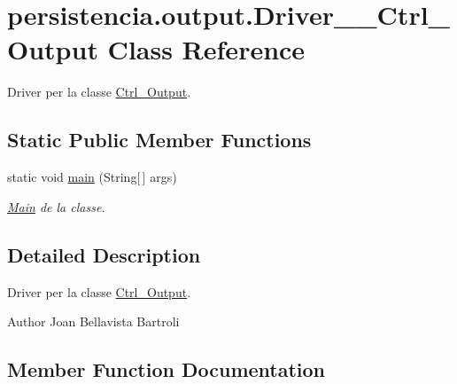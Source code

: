 \hypertarget{classpersistencia_1_1output_1_1Driver____Ctrl__Output}{}\section{persistencia.\+output.\+Driver\+\_\+\+\_\+\+Ctrl\+\_\+\+Output Class Reference}
\label{classpersistencia_1_1output_1_1Driver____Ctrl__Output}


Driver per la classe \hyperlink{classpersistencia_1_1output_1_1Ctrl__Output}{Ctrl\+\_\+\+Output}.  


\subsection*{Static Public Member Functions}
\begin{DoxyCompactItemize}
\item 
static void \hyperlink{classpersistencia_1_1output_1_1Driver____Ctrl__Output_ab5a20df1417ca8ac83a4c754c284599c}{main} (String\mbox{[}$\,$\mbox{]} args)
\begin{DoxyCompactList}\small\item\em \hyperlink{classMain}{Main} de la classe. \end{DoxyCompactList}\end{DoxyCompactItemize}


\subsection{Detailed Description}
Driver per la classe \hyperlink{classpersistencia_1_1output_1_1Ctrl__Output}{Ctrl\+\_\+\+Output}. 

\begin{DoxyAuthor}{Author}
Joan Bellavista Bartroli 
\end{DoxyAuthor}


\subsection{Member Function Documentation}
\mbox{\label{classpersistencia_1_1output_1_1Driver____Ctrl__Output_ab5a20df1417ca8ac83a4c754c284599c}} 

